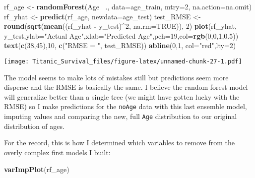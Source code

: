 \documentclass[]{article}
\newenvironment{Shaded}{\begin{snugshade}}{\end{snugshade}}
\newcommand{\KeywordTok}[1]{\textcolor[rgb]{0.13,0.29,0.53}{\textbf{#1}}}
\newcommand{\DataTypeTok}[1]{\textcolor[rgb]{0.13,0.29,0.53}{#1}}
\newcommand{\DecValTok}[1]{\textcolor[rgb]{0.00,0.00,0.81}{#1}}
\newcommand{\FloatTok}[1]{\textcolor[rgb]{0.00,0.00,0.81}{#1}}
\newcommand{\StringTok}[1]{\textcolor[rgb]{0.31,0.60,0.02}{#1}}
\newcommand{\OtherTok}[1]{\textcolor[rgb]{0.56,0.35,0.01}{#1}}
\newcommand{\OperatorTok}[1]{\textcolor[rgb]{0.81,0.36,0.00}{\textbf{#1}}}
\newcommand{\NormalTok}[1]{#1}
\begin{document}
\begin{Shaded}
\begin{Highlighting}[]
\NormalTok{rf_age <-}\StringTok{ }\KeywordTok{randomForest}\NormalTok{(Age }\OperatorTok{~}\NormalTok{., }\DataTypeTok{data=}\NormalTok{age_train, }\DataTypeTok{mtry=}\DecValTok{2}\NormalTok{, }\DataTypeTok{na.action=}\NormalTok{na.omit)}
\NormalTok{rf_yhat <-}\StringTok{ }\KeywordTok{predict}\NormalTok{(rf_age, }\DataTypeTok{newdata=}\NormalTok{age_test)}
\NormalTok{test_RMSE <-}\StringTok{ }\KeywordTok{round}\NormalTok{(}\KeywordTok{sqrt}\NormalTok{(}\KeywordTok{mean}\NormalTok{((rf_yhat }\OperatorTok{-}\StringTok{ }\NormalTok{y_test)}\OperatorTok{^}\DecValTok{2}\NormalTok{, }\DataTypeTok{na.rm=}\OtherTok{TRUE}\NormalTok{)), }\DecValTok{2}\NormalTok{)}
\KeywordTok{plot}\NormalTok{(rf_yhat, y_test,}\DataTypeTok{ylab=}\StringTok{"Actual Age"}\NormalTok{,}\DataTypeTok{xlab=}\StringTok{"Predicted Age"}\NormalTok{,}\DataTypeTok{pch=}\DecValTok{19}\NormalTok{,}\DataTypeTok{col=}\KeywordTok{rgb}\NormalTok{(}\DecValTok{0}\NormalTok{,}\DecValTok{0}\NormalTok{,}\DecValTok{1}\NormalTok{,}\FloatTok{0.5}\NormalTok{))}
\KeywordTok{text}\NormalTok{(}\KeywordTok{c}\NormalTok{(}\DecValTok{38}\NormalTok{,}\DecValTok{45}\NormalTok{),}\DecValTok{10}\NormalTok{, }\KeywordTok{c}\NormalTok{(}\StringTok{"RMSE = "}\NormalTok{, test_RMSE))}
\KeywordTok{abline}\NormalTok{(}\DecValTok{0}\NormalTok{,}\DecValTok{1}\NormalTok{, }\DataTypeTok{col=}\StringTok{"red"}\NormalTok{,}\DataTypeTok{lty=}\DecValTok{2}\NormalTok{)}
\end{Highlighting}
\end{Shaded}

\texttt{[image: Titanic\_Survival\_files/figure-latex/unnamed-chunk-27-1.pdf]}

The model seems to make lots of mistakes still but predictions seem more
disperse and the RMSE is basically the same. I believe the random forest
model will generalize better than a single tree (we might have gotten
lucky with the RMSE) so I make predictions for the \texttt{noAge} data
with this last ensemble model, imputing values and comparing the new,
full \texttt{Age} distribution to our original distribution of ages.

For the record, this is how I determined which variables to remove from
the overly complex first models I built:

\begin{Shaded}
\begin{Highlighting}[]
\KeywordTok{varImpPlot}\NormalTok{(rf_age)}
\end{Highlighting}
\end{Shaded}
\end{document}
